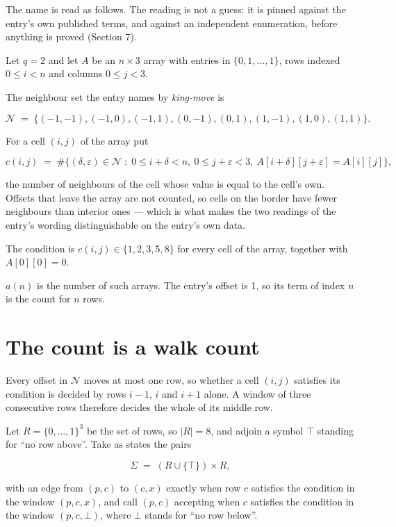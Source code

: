 \documentclass[11pt]{article}
\theoremstyle{definition}
\begin{document}
The name is read as follows. The reading is not a guess: it is pinned against the entry's own published terms, and against an independent enumeration, before anything is proved (Section 7).

Let $q = 2$ and let $A$ be an $n \times 3$ array with entries in $\{0,1,\dots,1\}$, rows indexed $0 \le i < n$ and columns $0 \le j < 3$.

The neighbour set the entry names by {\itshape king-move} is

\[\mathcal{N} \;=\; \{(-1,-1), (-1,0), (-1,1), (0,-1), (0,1), (1,-1), (1,0), (1,1)\}.\]

For a cell $(i,j)$ of the array put

\[c(i,j) \;=\; \#\bigl\{(\delta,\varepsilon)\in\mathcal{N} \;:\; 0\le i+\delta<n,\ 0\le j+\varepsilon<3,\ A[i+\delta][j+\varepsilon] = A[i][j]\bigr\},\]

the number of neighbours of the cell whose value is equal to the cell's own. Offsets that leave the array are not counted, so cells on the border have fewer neighbours than interior ones --- which is what makes the two readings of the entry's wording distinguishable on the entry's own data.

The condition is $c(i,j) \in \{1, 2, 3, 5, 8\}$ for every cell of the array, together with $A[0][0]=0$.

$a(n)$ is the number of such arrays. The entry's offset is 1, so its term of index $n$ is the count for $n$ rows.

\section{The count is a walk count}

Every offset in $\mathcal{N}$ moves at most one row, so whether a cell $(i,j)$ satisfies its condition is decided by rows $i-1$, $i$ and $i+1$ alone. A window of three consecutive rows therefore decides the whole of its middle row.

Let $R = \{0,\dots,1\}^{3}$ be the set of rows, so $|R| = 8$, and adjoin a symbol $\top$ standing for ``no row above''. Take as states the pairs

\[\Sigma \;=\; (R \cup \{\top\}) \times R,\]

with an edge from $(p,c)$ to $(c,x)$ exactly when row $c$ satisfies the condition in the window $(p,c,x)$, and call $(p,c)$ accepting when $c$ satisfies the condition in the window $(p,c,\bot)$, where $\bot$ stands for ``no row below''.
\end{document}
